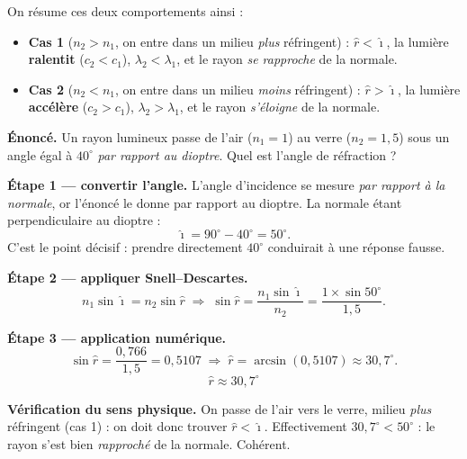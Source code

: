 \documentclass[11pt,a4paper]{article}
\newcommand{\angi}{\hat{\imath}}     %
\newcommand{\angr}{\hat{r}}          %
\begin{document}
\medskip
On résume ces deux comportements ainsi :
\begin{itemize}[leftmargin=1.8em,topsep=2pt]
  \item \textbf{Cas 1} ($n_2 > n_1$, on entre dans un milieu \emph{plus} réfringent) :
        $\angr < \angi$, la lumière \textbf{ralentit} ($c_2<c_1$), $\lambda_2 < \lambda_1$, et le
        rayon \emph{se rapproche} de la normale.
  \item \textbf{Cas 2} ($n_2 < n_1$, on entre dans un milieu \emph{moins} réfringent) :
        $\angr > \angi$, la lumière \textbf{accélère} ($c_2>c_1$), $\lambda_2 > \lambda_1$, et le
        rayon \emph{s'éloigne} de la normale.
\end{itemize}

\begin{exemple}\label{ex:dioptre40}
\textbf{Énoncé.} Un rayon lumineux passe de l'air ($n_1 = 1$) au verre ($n_2 = 1{,}5$) sous un angle
égal à $40^\circ$ \emph{par rapport au dioptre}. Quel est l'angle de réfraction ?

\smallskip
\textbf{Étape 1 — convertir l'angle.} L'angle d'incidence se mesure \emph{par rapport à la normale},
or l'énoncé le donne par rapport au dioptre. La normale étant perpendiculaire au dioptre :
\[ \angi = 90^\circ - 40^\circ = 50^\circ. \]
C'est le point décisif : prendre directement $40^\circ$ conduirait à une réponse fausse.

\smallskip
\textbf{Étape 2 — appliquer Snell–Descartes.}
\[ n_1\sin\angi = n_2\sin\angr \;\Longrightarrow\; \sin\angr = \frac{n_1\sin\angi}{n_2}
   = \frac{1 \times \sin 50^\circ}{1{,}5}. \]

\smallskip
\textbf{Étape 3 — application numérique.}
\[ \sin\angr = \frac{0{,}766}{1{,}5} = 0{,}5107 \;\Longrightarrow\; \angr = \arcsin(0{,}5107) \approx 30{,}7^\circ. \]
\[ \boxed{\angr \approx 30{,}7^\circ} \]

\textbf{Vérification du sens physique.} On passe de l'air vers le verre, milieu \emph{plus}
réfringent (cas 1) : on doit donc trouver $\angr < \angi$. Effectivement $30{,}7^\circ < 50^\circ$ :
le rayon s'est bien \emph{rapproché} de la normale. Cohérent.
\end{exemple}
\end{document}
